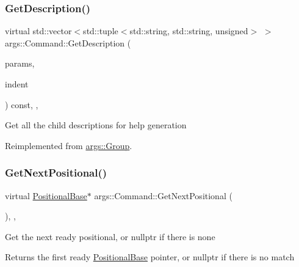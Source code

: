 \mbox{\label{classargs_1_1_command_afdd0a3ea344a4a5672565d1f2f0157f1}} 
\subsubsection{\texorpdfstring{Get\+Description()}{GetDescription()}}
{\footnotesize\ttfamily virtual std\+::vector$<$std\+::tuple$<$std\+::string, std\+::string, unsigned$>$ $>$ args\+::\+Command\+::\+Get\+Description (\begin{DoxyParamCaption}\item[{const \hyperlink{structargs_1_1_help_params}{Help\+Params} \&}]{params,  }\item[{const unsigned int}]{indent }\end{DoxyParamCaption}) const\hspace{0.3cm}{\ttfamily [inline]}, {\ttfamily [override]}, {\ttfamily [virtual]}}

Get all the child descriptions for help generation 

Reimplemented from \hyperlink{classargs_1_1_group_a57068f355d7d62316b41f7a8e2528495}{args\+::\+Group}.

\mbox{\label{classargs_1_1_command_a073266d188b3592f745c64567e566f8a}} 
\subsubsection{\texorpdfstring{Get\+Next\+Positional()}{GetNextPositional()}}
{\footnotesize\ttfamily virtual \hyperlink{classargs_1_1_positional_base}{Positional\+Base}$\ast$ args\+::\+Command\+::\+Get\+Next\+Positional (\begin{DoxyParamCaption}{ }\end{DoxyParamCaption})\hspace{0.3cm}{\ttfamily [inline]}, {\ttfamily [override]}, {\ttfamily [virtual]}}

Get the next ready positional, or nullptr if there is none

\begin{DoxyReturn}{Returns}
the first ready \hyperlink{classargs_1_1_positional_base}{Positional\+Base} pointer, or nullptr if there is no match 
\end{DoxyReturn}


